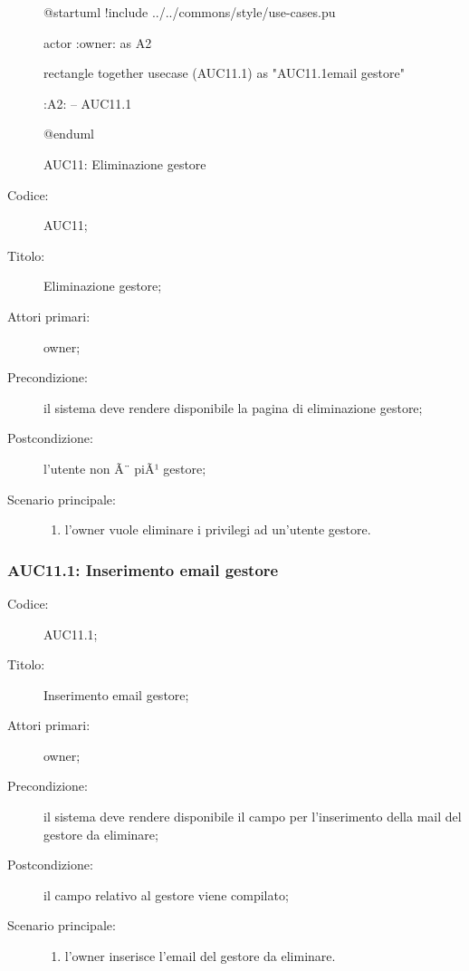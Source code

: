 \documentclass[../../../analisi-dei-requisiti.tex]{subfiles}
\begin{document}
\begin{figure}[H]
  \centering
  \begin{plantuml}
  @startuml
  !include ../../commons/style/use-cases.pu

  actor :owner: as A2


  rectangle {
    together {
      usecase (AUC11.1) as "AUC11.1\nInserimento email gestore"
    }
  }

  :A2: -- AUC11.1

  @enduml
  \end{plantuml}
  \caption{AUC11: Eliminazione gestore}%
  \label{fig:AUC11}
\end{figure}

\begin{description}
  \item[Codice:] AUC11;
  \item[Titolo:] Eliminazione gestore;
  \item[Attori primari:] owner;
  \item[Precondizione:] il sistema deve rendere disponibile la pagina di eliminazione gestore;
  \item[Postcondizione:] l'utente non Ã¨ piÃ¹ gestore;
  \item[Scenario principale:]
  \begin{enumerate}
    \item l'owner vuole eliminare i privilegi ad un'utente gestore.
  \end{enumerate}
\end{description}

\subsubsection{AUC11.1: Inserimento email gestore}%
\label{subs:AUC11.1}
\begin{description}
  \item[Codice:] AUC11.1;
  \item[Titolo:] Inserimento email gestore;
  \item[Attori primari:] owner;
  \item[Precondizione:] il sistema deve rendere disponibile il campo per l'inserimento della mail del gestore da eliminare;
  \item[Postcondizione:] il campo relativo al gestore viene compilato;
  \item[Scenario principale:]
  \begin{enumerate}
    \item l'owner inserisce l'email del gestore da eliminare.
  \end{enumerate}
\end{description}
\end{document}

